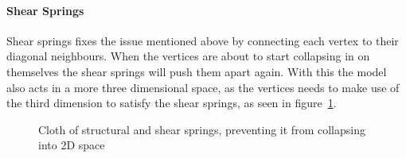\paragraph{Shear Springs}
Shear springs fixes the issue mentioned above by connecting each vertex to their diagonal neighbours.
When the vertices are about to start collapsing in on themselves the shear springs will push them apart again\cite{jeff_lander_real_time_cloth}.
With this the model also acts in a more three dimensional space, as the vertices needs to make use of the third dimension to satisfy the shear springs, as seen in figure~\ref{fig:shear_springs_collapsing}.
\begin{figure}[H]
    \centering
    \caption{Cloth of structural and shear springs, preventing it from collapsing into 2D space}
    \label{fig:shear_springs_collapsing}
\end{figure}

